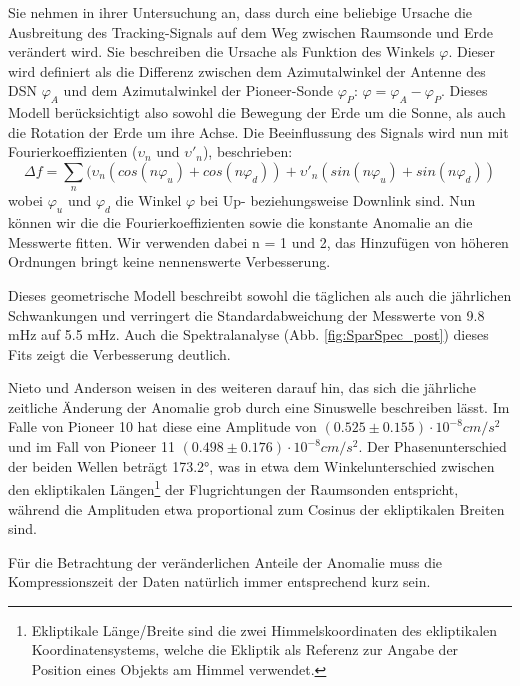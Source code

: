 Sie nehmen in ihrer Untersuchung an, dass durch eine beliebige Ursache die Ausbreitung des Tracking-Signals auf
dem Weg zwischen Raumsonde und Erde verändert wird. Sie beschreiben die Ursache als Funktion des Winkels $\varphi$. Dieser wird definiert als die Differenz zwischen dem Azimutalwinkel der Antenne des DSN $\varphi_A$ und dem Azimutalwinkel der Pioneer-Sonde $\varphi_P$: $\varphi=\varphi_A-\varphi_P$. %
Dieses Modell berücksichtigt also sowohl die Bewegung der Erde um die Sonne, als auch die Rotation der Erde um ihre Achse.
Die Beeinflussung des Signals wird nun mit Fourierkoeffizienten ($\upsilon_n$ und $\upsilon'_n$), beschrieben:
\begin{equation}
\Delta f = \sum_n (\upsilon_n(cos(n\varphi_u)+cos(n\varphi_d))+\upsilon'_n(sin(n\varphi_u)+sin(n\varphi_d))
\end{equation}
wobei $\varphi_u$ und $\varphi_d$ die Winkel $\varphi$ bei Up- beziehungsweise Downlink sind.
Nun können wir die die Fourierkoeffizienten sowie die konstante Anomalie an die Messwerte fitten. Wir verwenden dabei n = 1 und 2, das Hinzufügen von höheren Ordnungen bringt keine nennenswerte Verbesserung.

Dieses geometrische Modell beschreibt sowohl die täglichen als auch die jährlichen
Schwankungen und verringert die Standardabweichung der Messwerte von 9.8 mHz auf 5.5 mHz.
Auch die Spektralanalyse (Abb. \ref{fig:SparSpec_post}) dieses Fits zeigt die Verbesserung deutlich\cite{Levy2008}. %

Nieto und Anderson weisen in \cite{Nieto2005} des weiteren darauf hin, das sich die jährliche zeitliche Änderung der Anomalie %
grob durch eine Sinuswelle beschreiben lässt. Im Falle von Pioneer 10 hat diese eine Amplitude von $(0.525\pm0.155)\cdot10^{-8}cm/s^{2}$ und im Fall von Pioneer 11 $(0.498\pm0.176)\cdot10^{-8}cm/s^{2}$. Der Phasenunterschied der beiden Wellen beträgt 173.2°, was in etwa dem Winkelunterschied zwischen den ekliptikalen Längen\footnote{Ekliptikale Länge/Breite sind die zwei Himmelskoordinaten des ekliptikalen Koordinatensystems, welche die Ekliptik als Referenz zur Angabe der Position eines Objekts am Himmel verwendet.} der Flugrichtungen der Raumsonden entspricht, während die Amplituden etwa proportional zum Cosinus der ekliptikalen Breiten sind.

Für die Betrachtung der veränderlichen Anteile der Anomalie muss die Kompressionszeit der Daten natürlich immer entsprechend kurz sein\cite{Nieto2005}.